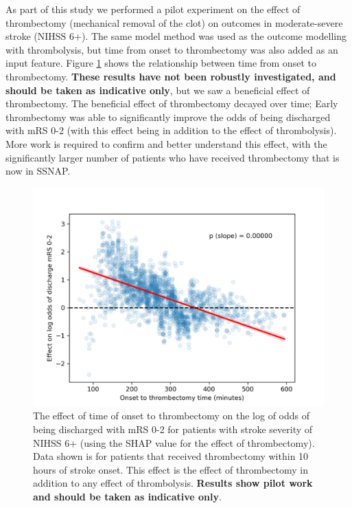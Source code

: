 As part of this study we performed a pilot experiment on the effect of thrombectomy (mechanical removal of the clot) on outcomes in moderate-severe stroke (NIHSS 6+). The same model method was used as the outcome modelling with thrombolysis, but time from onset to thrombectomy was also added as an input feature. Figure \ref{fig:thrombectomy} shows the relationship between time from onset to thrombectomy. \textbf{These results have not been robustly investigated, and should be taken as indicative only}, but we saw a beneficial effect of thrombectomy. The beneficial effect of thrombectomy decayed over time; Early thrombectomy was able to significantly improve the odds of being discharged with mRS 0-2 (with this effect being in addition to the effect of thrombolysis). More work is required to confirm and better understand this effect, with the significantly larger number of patients who have received thrombectomy that is now in SSNAP.

\begin{figure}[!h]
    \centering
    \includegraphics[width=0.6\linewidth]{images/thrombectomy}
    \caption{The effect of time of onset to thrombectomy on the log of odds of being discharged with mRS 0-2 for patients with stroke severity of NIHSS 6+ (using the SHAP value for the effect of thrombectomy). Data shown is for patients that received thrombectomy within 10 hours of stroke onset. This effect is the effect of thrombectomy in addition to any effect of thrombolysis. \textbf{Results show pilot work and should be taken as indicative only}.}
    \label{fig:thrombectomy}
\end{figure}



